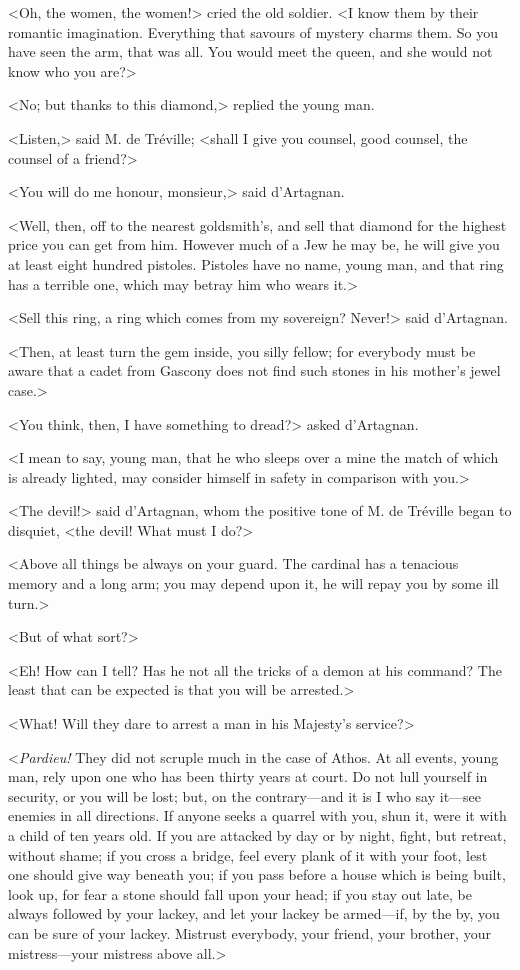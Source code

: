 <Oh, the women, the women!> cried the old soldier. <I know them by their romantic imagination. Everything that savours of mystery charms them. So you have seen the arm, that was all. You would meet the queen, and she would not know who you are?> 

<No; but thanks to this diamond,> replied the young man. 

<Listen,> said M. de Tréville; <shall I give you counsel, good counsel, the counsel of a friend?> 

<You will do me honour, monsieur,> said d'Artagnan. 

<Well, then, off to the nearest goldsmith's, and sell that diamond for the highest price you can get from him. However much of a Jew he may be, he will give you at least eight hundred pistoles. Pistoles have no name, young man, and that ring has a terrible one, which may betray him who wears it.> 

<Sell this ring, a ring which comes from my sovereign? Never!> said d'Artagnan. 

<Then, at least turn the gem inside, you silly fellow; for everybody must be aware that a cadet from Gascony does not find such stones in his mother's jewel case.> 

<You think, then, I have something to dread?> asked d'Artagnan. 

<I mean to say, young man, that he who sleeps over a mine the match of which is already lighted, may consider himself in safety in comparison with you.> 

<The devil!> said d'Artagnan, whom the positive tone of M. de Tréville began to disquiet, <the devil! What must I do?> 

<Above all things be always on your guard. The cardinal has a tenacious memory and a long arm; you may depend upon it, he will repay you by some ill turn.> 

<But of what sort?> 

<Eh! How can I tell? Has he not all the tricks of a demon at his command? The least that can be expected is that you will be arrested.> 

<What! Will they dare to arrest a man in his Majesty's service?> 

<\textit{Pardieu!} They did not scruple much in the case of Athos. At all events, young man, rely upon one who has been thirty years at court. Do not lull yourself in security, or you will be lost; but, on the contrary---and it is I who say it---see enemies in all directions. If anyone seeks a quarrel with you, shun it, were it with a child of ten years old. If you are attacked by day or by night, fight, but retreat, without shame; if you cross a bridge, feel every plank of it with your foot, lest one should give way beneath you; if you pass before a house which is being built, look up, for fear a stone should fall upon your head; if you stay out late, be always followed by your lackey, and let your lackey be armed---if, by the by, you can be sure of your lackey. Mistrust everybody, your friend, your brother, your mistress---your mistress above all.> 

